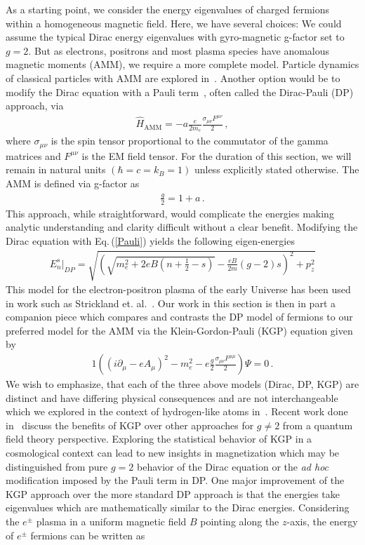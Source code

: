 \documentclass[universe,article,submit,moreauthors,pdftex,a4paper]{Definitions/mdpi}
\newcommand{\req}[1]{Eq.\,(\ref{#1})}
\begin{document}
As a starting point, we consider the energy eigenvalues of charged fermions within a homogeneous magnetic field. Here, we have several choices: We could assume the typical Dirac energy eigenvalues with gyro-magnetic g-factor set to $g=2$. But as electrons, positrons and most plasma species have anomalous magnetic moments (AMM), we require a more complete model. Particle dynamics of classical particles with AMM are explored in~\cite{Rafelski:2017hce,Formanek:2017mbv,Formanek:2020zwc,Formanek:2021mcp}. Another option would be to modify the Dirac equation with a Pauli term~\cite{thaller2013dirac}, often called the Dirac-Pauli (DP) approach, via
\begin{align}
 \label{Pauli} \hat{H}_{\mathrm{AMM}} = -a\frac{e}{2m_{e}}\frac{\sigma_{\mu\nu}F^{\mu\nu}}{2}\,,
\end{align}
where $\sigma_{\mu\nu}$ is the spin tensor proportional to the commutator of the gamma matrices and $F^{\mu\nu}$ is the EM field tensor. For the duration of this section, we will remain in natural units $(\hbar=c=k_{B}=1)$ unless explicitly stated otherwise. The AMM is defined via g-factor as
\begin{align}
 \label{AMM} \frac{g}{2}=1+a\,.
\end{align}
This approach, while straightforward, would complicate the energies making analytic understanding and clarity difficult without a clear benefit. Modifying the Dirac equation with \req{Pauli} yields the following eigen-energies
\begin{align}
 \label{DPEnergy} E_{n}^{s}\vert_{DP}=\sqrt{\left(\sqrt{m_{e}^{2}+2eB\left(n+\frac{1}{2}-s\right)}-\frac{eB}{2m}(g-2)s\right)^{2}+p_{z}^{2}}
\end{align}
This model for the electron-positron plasma of the early Universe has been used in work such as Strickland et. al.~\cite{Strickland:2012vu}. Our work in this section is then in part a companion piece which compares and contrasts the DP model of fermions to our preferred model for the AMM via the Klein-Gordon-Pauli (KGP) equation given by
\begin{alignat}{1}
 \label{KGP} \left(\left(i\partial_{\mu}-eA_{\mu}\right)^{2}-m_{e}^{2}-e\frac{g}{2}\frac{\sigma_{\mu\nu}F^{\mu\mu}}{2}\right)\Psi=0\,.
\end{alignat}
We wish to emphasize, that each of the three above models (Dirac, DP, KGP) are distinct and have differing physical consequences and are not interchangeable which we explored in the context of hydrogen-like atoms in~\cite{Steinmetz:2018ryf}. Recent work done in~\cite{rafelski2023study} discuss the benefits of KGP over other approaches for $g\neq2$ from a quantum field theory perspective. Exploring the statistical behavior of KGP in a cosmological context can lead to new insights in magnetization which may be distinguished from pure $g=2$ behavior of the Dirac equation or the \emph{ad hoc} modification imposed by the Pauli term in DP. One major improvement of the KGP approach over the more standard DP approach is that the energies take eigenvalues which are mathematically similar to the Dirac energies. Considering the $e^\pm$ plasma in a uniform magnetic field $B$ pointing along the $z$-axis, the energy of $e^\pm$ fermions can be written as
\end{document}

